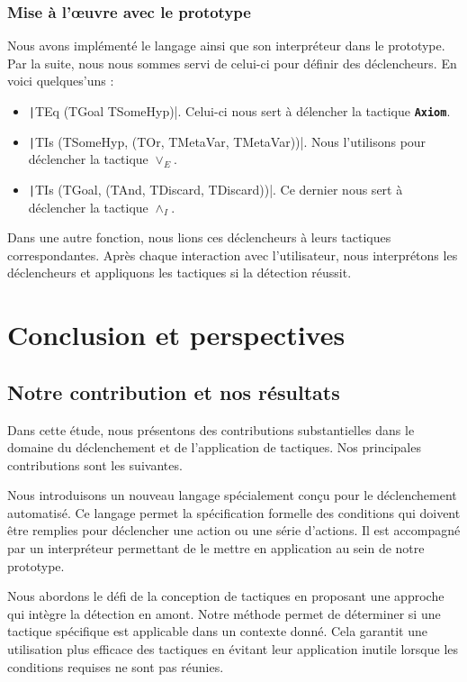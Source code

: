 \documentclass[french,titlepage]{article}
\newcommand{\textttbf}[1]{\texttt{\textbf{#1}}}
\begin{document}
\subsubsection{Mise à l'œuvre avec le prototype}
Nous avons implémenté le langage ainsi que son interpréteur dans le prototype. Par la suite, nous nous sommes servi de celui-ci pour définir des déclencheurs. En voici quelques'uns :
\begin{itemize}
    \item \texttt|TEq (TGoal TSomeHyp)|. Celui-ci nous sert à délencher la tactique \textttbf{Axiom}.
    \item \texttt|TIs (TSomeHyp, (TOr, TMetaVar, TMetaVar))|. Nous l'utilisons pour déclencher la tactique $\lor_E$.
    \item \texttt|TIs (TGoal, (TAnd, TDiscard, TDiscard))|. Ce dernier nous sert à déclencher la tactique $\land_I$.
\end{itemize}
Dans une autre fonction, nous lions ces déclencheurs à leurs tactiques correspondantes. Après chaque interaction avec l'utilisateur, nous interprétons les déclencheurs et appliquons les tactiques si la détection réussit.

\section{Conclusion et perspectives} \label{conclusion}
\subsection{Notre contribution et nos résultats} \label{conclusion:contribution_resultats}
Dans cette étude, nous présentons des contributions substantielles dans le domaine du déclenchement et de l'application de tactiques. Nos principales contributions sont les suivantes.

Nous introduisons un nouveau langage spécialement conçu pour le déclenchement automatisé. Ce langage permet la spécification formelle des conditions qui doivent être remplies pour déclencher une action ou une série d'actions. Il est accompagné par un interpréteur permettant de le mettre en application au sein de notre prototype.

Nous abordons le défi de la conception de tactiques en proposant une approche qui intègre la détection en amont. Notre méthode permet de déterminer si une tactique spécifique est applicable dans un contexte donné. Cela garantit une utilisation plus efficace des tactiques en évitant leur application inutile lorsque les conditions requises ne sont pas réunies.
\end{document}
